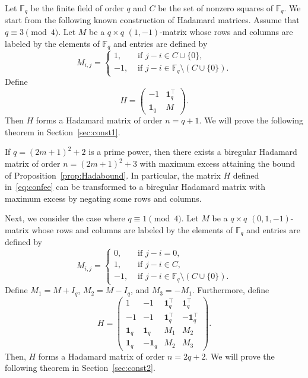 \documentclass[ALCO,ThmDefs,Unicode]{cedram}
\newcommand*\F{{\mathbb F}}
\newcommand*\tra{\top}
\newcommand*{\un}{\mathbf{1}}
\begin{document}
Let $\F_q$ be the finite field of order $q$ and $C$ be the set of nonzero squares of $\F_{q}$. We start from the following known construction of Hadamard matrices. Assume that $q\equiv 3\pmod{4}$. Let $M$ be a $q\times q$ $(1,-1)$-matrix whose rows and columns are labeled by the elements of $\F_q$ and entries are defined by
\[
M_{i,j}=
\begin{cases}
1,& \text{ if } j-i\in C \cup \{0\},\\
-1,& \text{ if } j-i\in \F_q\setminus (C \cup \{0\}).
\end{cases}
\]
Define
\begin{equation}\label{eq:confee}
H=
\begin{pmatrix} -1 & \un_q^\tra \\ \un_q & M
\end{pmatrix}.
\end{equation}
Then $H$ forms a Hadamard matrix of order $n=q+1$. We will prove the following theorem in Section~\ref{sec:const1}.

\begin{theo}\label{thm:main1}
If $q=(2m+1)^2+2$ is a prime power, then there exists a biregular Hadamard matrix of order $n=(2m+1)^2+3$ with maximum excess attaining the bound of Proposition~\ref{prop:Hadabound}. In particular, the matrix $H$ defined in~\eqref{eq:confee} can be transformed to a biregular Hadamard matrix with maximum excess by negating some rows and columns.
\end{theo}

Next, we consider the case where $q\equiv 1\pmod{4}$. Let $M$ be a $q\times q$ $(0,1,-1)$-matrix whose rows and columns are labeled by the elements of $\F_q$ and entries are defined by
\[
M_{i,j}=
\begin{cases}
0,& \text{ if } j-i=0,\\
1,& \text{ if } j-i\in C,\\
-1,& \text{ if } j-i\in \F_q \setminus (C \cup \{0\}).
\end{cases}
\]
Define $M_1=M+I_q$, $M_2=M-I_q$, and $M_3=-M_1$. Furthermore, define
\begin{equation}\label{eq:hada2ee}
H=
\begin{pmatrix}
1 &-1 & \un_q^\tra& \un_q^\tra \\
-1 & -1 & \un_q^\tra&-\un_q^\tra \\
\un_q & \un_q &M_1 & M_2 \\
\un_q & -\un_q&M_2 & M_3
\end{pmatrix}.
\end{equation}
Then, $H$ forms a Hadamard matrix of order $n=2q+2$. We will prove the following theorem in Section~\ref{sec:const2}.
\end{document}
